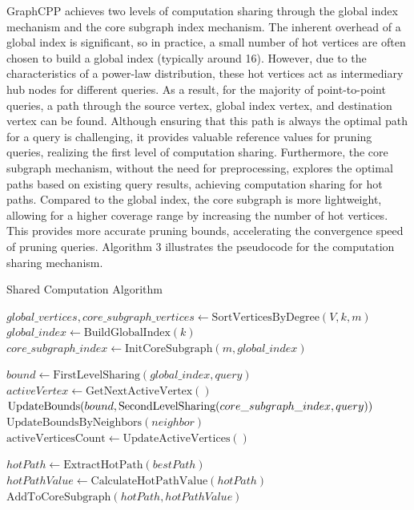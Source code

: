 \documentclass[lettersize,journal]{IEEEtran} %
\begin{document}
GraphCPP achieves two levels of computation sharing through the global index mechanism and the core subgraph index mechanism. The inherent overhead of a global index is significant, so in practice, a small number of hot vertices are often chosen to build a global index (typically around 16). However, due to the characteristics of a power-law distribution, these hot vertices act as intermediary hub nodes for different queries. As a result, for the majority of point-to-point queries, a path through the source vertex, global index vertex, and destination vertex can be found. Although ensuring that this path is always the optimal path for a query is challenging, it provides valuable reference values for pruning queries, realizing the first level of computation sharing. Furthermore, the core subgraph mechanism, without the need for preprocessing, explores the optimal paths based on existing query results, achieving computation sharing for hot paths. Compared to the global index, the core subgraph is more lightweight, allowing for a higher coverage range by increasing the number of hot vertices. This provides more accurate pruning bounds, accelerating the convergence speed of pruning queries. Algorithm 3 illustrates the pseudocode for the computation sharing mechanism.

\begin{algorithm}
    \caption{Shared Computation Algorithm}
    \begin{algorithmic}[1]
    
        \State $global\_vertices, core\_subgraph\_vertices \gets \text{SortVerticesByDegree}(V, k, m)$
        \State $global\_index \gets \text{BuildGlobalIndex}(k)$
        \State $core\_subgraph\_index \gets \text{InitCoreSubgraph}(m, global\_index)$
    \EndFunction

        \State $bound \gets \text{FirstLevelSharing}(global\_index, query)$ 
            \State $activeVertex \gets \text{GetNextActiveVertex}()$
                \State $\text{UpdateBounds}(bound, \text{SecondLevelSharing}\newline (core\_subgraph\_index, query))$
            \EndIf
                \State $\text{UpdateBoundsByNeighbors}(neighbor)$
            \EndFor
            \State $\text{activeVerticesCount} \gets \text{UpdateActiveVertices}()$
        \EndWhile
    \EndFunction

        \State $hotPath \gets \text{ExtractHotPath}(bestPath)$
        \State $hotPathValue \gets \text{CalculateHotPathValue}(hotPath)$
        \State $\text{AddToCoreSubgraph}(hotPath, hotPathValue)$
    \EndFunction
    
    \end{algorithmic}
\end{algorithm}
\end{document}
